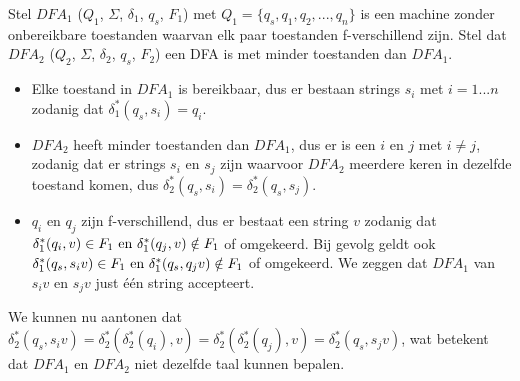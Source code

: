   Stel $DFA_1$ ($Q_1$, $\Sigma$, $\delta_1$, $q_s$, $F_1$) met $Q_1 = \{q_s,q_1,q_2,...,q_n\}$ is een machine zonder onbereikbare toestanden waarvan elk paar toestanden f-verschillend zijn. Stel dat $DFA_2$ ($Q_2$, $\Sigma$, $\delta_2$, $q_s$, $F_2$) een DFA is met minder toestanden dan $DFA_1$.

  \begin{itemize}
  \item Elke toestand in $DFA_1$ is bereikbaar, dus er bestaan strings $s_i$ met $i=1...n$ zodanig dat $\delta^*_1(q_s,s_i)=q_i$.
  \item $DFA_2$ heeft minder toestanden dan $DFA_1$, dus er is een $i$ en $j$ met $i \neq j$, zodanig dat er strings $s_i$ en $s_j$ zijn waarvoor $DFA_2$ meerdere keren in dezelfde toestand komen, dus $\delta^*_2(q_s,s_i)=\delta^*_2(q_s,s_j)$.
  \item $q_i$ en $q_j$ zijn f-verschillend, dus er bestaat een string $v$ zodanig dat $\delta^*_1(q_i,v) \in F_1 \text{ en } \delta^*_1(q_j,v) \notin F_1$ of omgekeerd. Bij gevolg geldt ook $\delta^*_1(q_s,s_iv) \in F_1 \text{ en } \delta^*_1(q_s,q_jv) \notin F_1$ of omgekeerd. We zeggen dat $DFA_1$ van $s_iv$ en $s_jv$ just \'e\'en string accepteert.
  \end{itemize}
  
  We kunnen nu aantonen dat $\delta^*_2(q_s,s_iv) = \delta^*_2(\delta^*_2(q_i),v) = \delta^*_2(\delta^*_2(q_j),v) = \delta^*_2(q_s,s_jv)$, wat betekent dat $DFA_1$ en $DFA_2$ niet dezelfde taal kunnen bepalen.